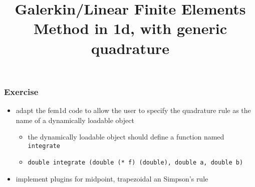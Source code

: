 \documentclass[smaller,a4paper]{beamer}
\newcommand{\cpp}[1]{\lstinline!#1!}
\begin{document}
\title{Galerkin/Linear Finite Elements Method in 1d, with generic quadrature}
\frame{\titlepage}


\begin{frame}\frametitle{Exercise}
\begin{itemize}
\item adapt the fem1d code to allow the user to specify the quadrature rule as the name of a dynamically loadable object
\begin{itemize}
\item the dynamically loadable object should define a function named \cpp{integrate}
\item \cpp{double integrate (double (* f) (double), double a, double b)}
\end{itemize}
\item implement plugins for midpoint, trapezoidal an Simpson's rule
\end{itemize}
\end{frame}
\end{document}
